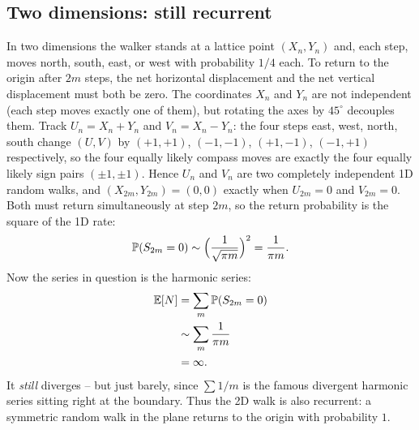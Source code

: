 \subsection{Two dimensions: still recurrent}

In two dimensions the walker stands at a lattice point $(X_n, Y_n)$ and, each step, moves
north, south, east, or west with probability $1/4$ each. To return to the
origin after $2m$ steps, the net horizontal displacement and the net vertical
displacement must both be zero. The coordinates $X_n$ and $Y_n$ are not independent
(each step moves exactly one of them), but rotating the axes by $45^\circ$ decouples
them. Track $U_n = X_n + Y_n$ and $V_n = X_n - Y_n$: the four steps east, west, north,
south change $(U, V)$ by $(+1,+1)$, $(-1,-1)$, $(+1,-1)$, $(-1,+1)$ respectively, so the
four equally likely compass moves are exactly the four equally likely sign pairs
$(\pm 1, \pm 1)$. Hence $U_n$ and $V_n$ are two completely independent 1D random walks,
and $(X_{2m}, Y_{2m}) = (0,0)$ exactly when $U_{2m} = 0$ and $V_{2m} = 0$. Both must
return simultaneously at step $2m$, so the return probability is the square of the 1D rate:
\[
  \P(S_{2m} = 0) \sim \Big(\frac{1}{\sqrt{\pi m}}\Big)^2 = \frac{1}{\pi m}.
\]
Now the series in question is the harmonic series:
\begin{align*}
  \E[N] &= \sum_m \P(S_{2m}=0) \\
  &\sim \sum_m \frac{1}{\pi m} \\
  &= \infty.
\end{align*}
It \emph{still} diverges -- but just barely, since $\sum 1/m$ is the famous
divergent harmonic series sitting right at the boundary. Thus the 2D walk is also
recurrent: a symmetric random walk in the plane returns to the origin with probability $1$.

